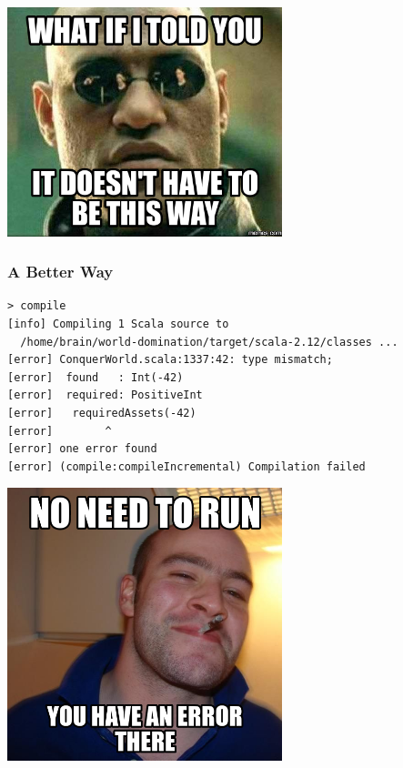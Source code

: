 \documentclass{beamer}
\begin{document}
\begin{frame}
  \begin{center}
    \includegraphics[width=0.6\textwidth]{../pics/told-you.png}
  \end{center}
\end{frame}

\begin{frame}[fragile]
  \frametitle{A Better Way}
\begin{verbatim}
> compile
[info] Compiling 1 Scala source to 
  /home/brain/world-domination/target/scala-2.12/classes ...
[error] ConquerWorld.scala:1337:42: type mismatch;
[error]  found   : Int(-42)
[error]  required: PositiveInt
[error]   requiredAssets(-42)
[error]        ^
[error] one error found
[error] (compile:compileIncremental) Compilation failed
\end{verbatim}
\end{frame}

\begin{frame}
  \begin{center}
    \includegraphics[width=0.6\textwidth]{../pics/good-compiler.png}
  \end{center}
\end{frame}
\end{document}
